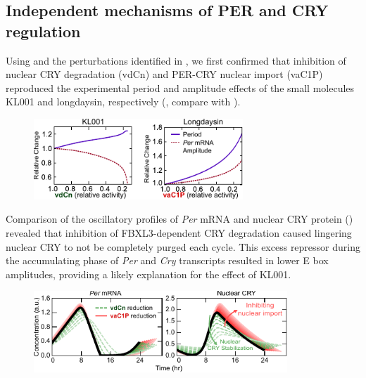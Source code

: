 \subsection{Independent mechanisms of PER and CRY regulation}
Using  and the perturbations identified in , we first confirmed that inhibition of nuclear CRY degradation (vdCn) and PER-CRY nuclear import (vaC1P) reproduced the experimental period and amplitude effects of the small molecules KL001 and longdaysin, respectively (, compare with ). 

\begin{figure}[h]
  \centering
  \includegraphics[width=0.7\textwidth]{chap4/figures/fig4a.pdf}
  \label{fig:44a}
\end{figure}

Comparison of the oscillatory profiles of {\it Per} mRNA and nuclear CRY protein () revealed that inhibition of FBXL3-dependent CRY degradation caused lingering nuclear CRY to not be completely purged each cycle. 
This excess repressor during the accumulating phase of {\it Per} and {\it Cry} transcripts resulted in lower E box amplitudes, providing a likely explanation for the effect of KL001.

\begin{figure}[h]
  \centering
  \includegraphics[width=0.85\textwidth]{chap4/figures/fig4b.pdf}
  \label{fig:44b}
\end{figure}

